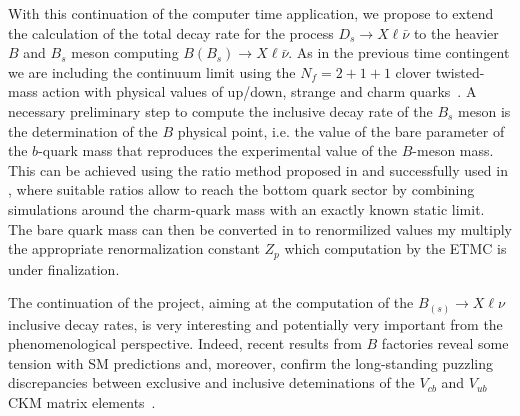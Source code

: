 With this continuation of the computer time application, we propose to extend
the calculation of the total decay rate for the process $D_s \to X\ell\bar\nu$ to the
heavier $B$ and $B_s$ meson computing  $B (B_s) \to X\ell\bar\nu$.
As in the previous time contingent we are including the continuum limit
using the $N_f=2+1+1$ clover twisted-mass action with physical
values of up/down, strange and charm
quarks~\cite{ExtendedTwistedMass:2021qui,ExtendedTwistedMass:2021gbo,ExtendedTwistedMass:2022jpw}.
A necessary preliminary step to compute the inclusive decay rate of the $B_s$
meson is the determination of the
$B$ physical point, i.e. the value of the bare parameter of the $b$-quark mass that reproduces the
experimental value of the $B$-meson mass.
This can be
achieved using the ratio method proposed in \cite{ETM:2009sed}
and successfully used in \cite{ETM:2016nbo}, where suitable ratios allow
to reach the bottom quark sector by combining simulations around the
charm-quark mass with an exactly known static limit.
The bare quark mass can then be converted in to renormilized values my multiply
the appropriate renormalization constant $Z_p$ which computation by the ETMC
is under finalization.


The continuation of the project, aiming at the computation of the $B_{(s)}\to X \ell\nu$
inclusive decay rates, is very interesting and potentially very important from
the phenomenological perspective. Indeed, recent results from $B$ factories reveal
some tension with SM predictions and, moreover, confirm the long-standing puzzling
discrepancies between exclusive and inclusive deteminations of the $V_{cb}$ and
$V_{ub}$ CKM matrix elements~\cite{ParticleDataGroup:2022pth, HFLAV:2022esi, Gambino:2019sif}.
